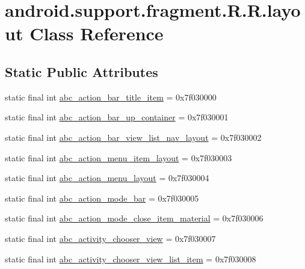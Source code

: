 \hypertarget{classandroid_1_1support_1_1fragment_1_1_r_1_1layout}{
\section{android.support.fragment.R.R.layout Class Reference}
\label{classandroid_1_1support_1_1fragment_1_1_r_1_1layout}
}
\subsection*{Static Public Attributes}
\begin{CompactItemize}
\item 
static final int \hyperlink{classandroid_1_1support_1_1fragment_1_1_r_1_1layout_8825a060f410a54627f88e8014f7331f}{abc\_\-action\_\-bar\_\-title\_\-item} = 0x7f030000
\item 
static final int \hyperlink{classandroid_1_1support_1_1fragment_1_1_r_1_1layout_311420a8fecb391ab9d344647c6dd948}{abc\_\-action\_\-bar\_\-up\_\-container} = 0x7f030001
\item 
static final int \hyperlink{classandroid_1_1support_1_1fragment_1_1_r_1_1layout_b09347bd86fef641ea96f8779a2baa87}{abc\_\-action\_\-bar\_\-view\_\-list\_\-nav\_\-layout} = 0x7f030002
\item 
static final int \hyperlink{classandroid_1_1support_1_1fragment_1_1_r_1_1layout_b294dce75ea977eec0e0af2203e003d4}{abc\_\-action\_\-menu\_\-item\_\-layout} = 0x7f030003
\item 
static final int \hyperlink{classandroid_1_1support_1_1fragment_1_1_r_1_1layout_9bef40aaf5be223b8382fc5ee5ac6d0e}{abc\_\-action\_\-menu\_\-layout} = 0x7f030004
\item 
static final int \hyperlink{classandroid_1_1support_1_1fragment_1_1_r_1_1layout_3e32a011062322ad7c6315de6db31e25}{abc\_\-action\_\-mode\_\-bar} = 0x7f030005
\item 
static final int \hyperlink{classandroid_1_1support_1_1fragment_1_1_r_1_1layout_7915166960924273e0d861ce89f9426f}{abc\_\-action\_\-mode\_\-close\_\-item\_\-material} = 0x7f030006
\item 
static final int \hyperlink{classandroid_1_1support_1_1fragment_1_1_r_1_1layout_b04df92dd9e71da7fe5d0bd5ddf110c8}{abc\_\-activity\_\-chooser\_\-view} = 0x7f030007
\item 
static final int \hyperlink{classandroid_1_1support_1_1fragment_1_1_r_1_1layout_1570696b50b7f1c1d1aca625671d1bd4}{abc\_\-activity\_\-chooser\_\-view\_\-list\_\-item} = 0x7f030008

\end{CompactItemize}
